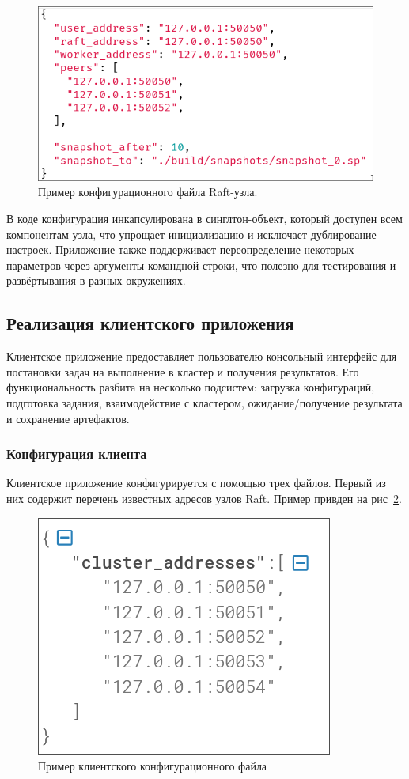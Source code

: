 \begin{figure}[h!]
    \centering
    \includegraphics[width=0.65\linewidth]{inc/raft_config_example.png}
    \caption{Пример конфигурационного файла Raft-узла.}
    \label{fig:raftconfig}
\end{figure}

В коде конфигурация инкапсулирована в синглтон-объект, который доступен всем
компонентам узла, что упрощает инициализацию и исключает дублирование настроек.
Приложение также поддерживает переопределение некоторых параметров через
аргументы командной строки, что полезно для тестирования и развёртывания в
разных окружениях.

\subsection{Реализация клиентского приложения}

Клиентское приложение предоставляет пользователю консольный интерфейс для
постановки задач на выполнение в кластер и получения результатов. Его
функциональность разбита на несколько подсистем: загрузка конфигураций,
подготовка задания, взаимодействие с кластером, ожидание/получение результата и
сохранение артефактов.

\subsubsection{Конфигурация клиента}

Клиентское приложение конфигурируется с помощью трех файлов. Первый из них
содержит перечень известных адресов узлов Raft. Пример привден на
рис~\ref{fig:client_config}.

\begin{figure}
  \centering
  \includegraphics[scale=0.4]{inc/client-config.png}
  \caption{Пример клиентского конфигурационного файла}
  \label{fig:client_config}
\end{figure}

